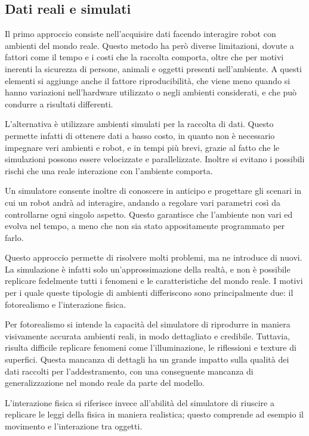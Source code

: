 \documentclass[12pt]{report}
\begin{document}
\subsection{Dati reali e simulati}
\label{sec:dati_reali_e_simulati}

Il primo approccio consiste nell'acquisire dati facendo interagire robot con ambienti del mondo reale. Questo metodo ha però diverse limitazioni, dovute a fattori come il tempo e i costi che la raccolta comporta, oltre che per motivi inerenti la sicurezza di persone, animali e oggetti presenti nell'ambiente. A questi elementi si aggiunge anche il fattore riproducibilità, che viene meno quando si hanno variazioni nell'hardware utilizzato o negli ambienti considerati, e che può condurre a risultati differenti.

L'alternativa è utilizzare ambienti simulati per la raccolta di dati. Questo permette infatti di ottenere dati a basso costo, in quanto non è necessario impegnare veri ambienti e robot, e in tempi più brevi, grazie al fatto che le simulazioni possono essere velocizzate e parallelizzate. Inoltre si evitano i possibili rischi che una reale interazione con l'ambiente comporta.

Un simulatore consente inoltre di conoscere in anticipo e progettare gli scenari in cui un robot andrà ad interagire, andando a regolare vari parametri così da controllarne ogni singolo aspetto. Questo garantisce che l'ambiente non vari ed evolva nel tempo, a meno che non sia stato appositamente programmato per farlo.

Questo approccio permette di risolvere molti problemi, ma ne introduce di nuovi. La simulazione è infatti solo un'approssimazione della realtà, e non è possibile replicare fedelmente tutti i fenomeni e le caratteristiche del mondo reale. I motivi per i quale queste tipologie di ambienti differiscono sono principalmente due: il fotorealismo e l'interazione fisica.

Per fotorealismo si intende la capacità del simulatore di riprodurre in maniera visivamente accurata ambienti reali, in modo dettagliato e credibile. Tuttavia, risulta difficile replicare fenomeni come l'illuminazione, le riflessioni e texture di superfici. Questa mancanza di dettagli ha un grande impatto sulla qualità dei dati raccolti per l'addestramento, con una conseguente mancanza di generalizzazione nel mondo reale da parte del modello.

L'interazione fisica si riferisce invece all'abilità del simulatore di riuscire a replicare le leggi della fisica in maniera realistica; questo comprende ad esempio il movimento e l'interazione tra oggetti. 
\end{document}
